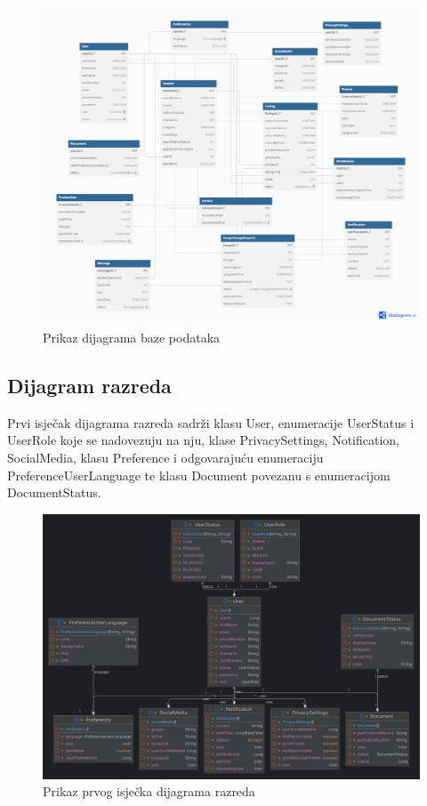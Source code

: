 \begin{figure} [H]
	
	\includegraphics[width=1\linewidth]{slike/RelacijskiDijagramBP.png}
	\centering
	\caption{Prikaz dijagrama baze podataka}
	\label{fig:Prikaz dijagrama baze podataka}
\end{figure}

\subsection{Dijagram razreda}

Prvi isječak dijagrama razreda sadrži klasu User, enumeracije UserStatus i UserRole koje se nadovezuju na nju, klase PrivacySettings, Notification, SocialMedia, klasu Preference i odgovarajuću enumeraciju PreferenceUserLanguage te klasu Document povezanu s enumeracijom DocumentStatus.
\begin{figure} [H]

	\includegraphics[width=1\linewidth]{slike/ClassDiagram1.png}
	\centering
	\caption{Prikaz prvog isječka dijagrama razreda}
	\label{fig:Prikaz prvog isječka dijagrama razreda}
\end{figure}

